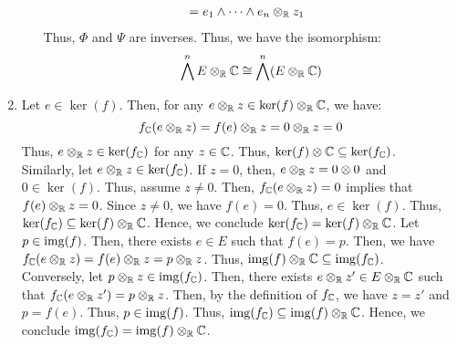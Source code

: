 \documentclass[12pt]{article}
\begin{document}
\begin{solu}
\begin{enumerate}
\begin{itemize}
\begin{align*}
                &= e_1 \wedge \cdots \wedge e_n \otimes_\mathbb R z_1
            \end{align*}
            Thus, $\Phi$ and $\Psi$ are inverses. Thus, we have the isomorphism:
            \[  \bigwedge^n E \otimes_\mathbb R \mathbb C \cong \bigwedge^n (E \otimes_\mathbb R \mathbb C)\]
        \end{itemize}
        \item Let $e \in \ker(f)$. Then, for any $e \otimes_\mathbb R z \in \ker(f) \otimes_\mathbb R \mathbb C$, we have:
        \[f_\mathbb C(e \otimes_\mathbb R z) = f(e) \otimes_\mathbb R z = 0 \otimes_\mathbb R z = 0 \]
        Thus, $e \otimes_\mathbb R z \in \ker(f_\mathbb C)$ for any $z \in \mathbb C$. Thus, $\ker(f) \otimes \mathbb C \subseteq \ker(f_\mathbb C)$. \\
        Similarly, let $e \otimes_\mathbb R z \in \ker(f_\mathbb C)$. If $z = 0$, then, $e \otimes_\mathbb R z = 0 \otimes 0$ and $0 \in \ker(f)$. Thus, assume $z \neq 0$. Then, $f_\mathbb C(e \otimes_\mathbb R z) = 0$ implies that $f(e) \otimes_\mathbb R z = 0$. Since $z \neq 0$, we have $f(e) = 0$. Thus, $e \in \ker(f)$. Thus, $\ker(f_\mathbb C) \subseteq \ker(f) \otimes_\mathbb R \mathbb C$. Hence, we conclude $\ker(f_\mathbb C) = \ker(f) \otimes_\mathbb R \mathbb C$. \bbni
        Let $p \in \operatorname{img}(f)$. Then, there exists $e \in E$ such that $f(e) = p$. Then, we have $f_\mathbb C(e \otimes_\mathbb R z) = f(e) \otimes_\mathbb R z = p \otimes_\mathbb R z$. Thus, $\operatorname{img}(f) \otimes_\mathbb R \mathbb C \subseteq \operatorname{img}(f_\mathbb C)$. \\
        Conversely, let $p \otimes_\mathbb R z \in \operatorname{img}(f_\mathbb C)$. Then, there exists $e \otimes_\mathbb R z' \in E \otimes_\mathbb R \mathbb C$ such that $f_\mathbb C(e \otimes_\mathbb R z') = p \otimes_\mathbb R z$. Then, by the definition of $f_\mathbb C$, we have $z = z'$ and $p = f(e)$. Thus, $p \in \operatorname{img}(f)$. Thus, $\operatorname{img}(f_\mathbb C) \subseteq \operatorname{img}(f) \otimes_\mathbb R \mathbb C$. Hence, we conclude $\operatorname{img}(f_\mathbb C) = \operatorname{img}(f) \otimes_\mathbb R \mathbb C$.
    \end{enumerate}
\end{solu}

\newpage
\end{document}
